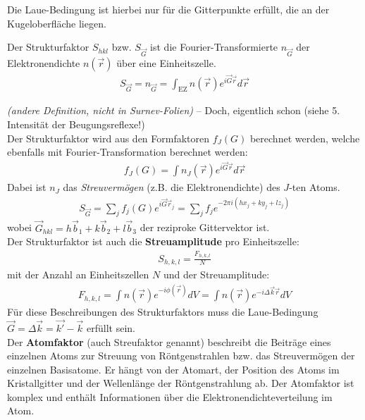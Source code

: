 Die Laue-Bedingung ist hierbei nur für die Gitterpunkte erfüllt, die an der Kugeloberfläche liegen. 


\label{q:27}

Der Strukturfaktor $S_{hkl}$ bzw. $S_{\vec{G}}$ ist die Fourier-Transformierte $n_{\Vec{G}}$ der Elektronendichte $n(\vec{r})$ über eine Einheitszelle. 
\begin{align}
    S_{\vec{G}} = n_{\vec{G}} = \int_{\text{EZ}} n(\vec{r}) e^{i \vec{G} \vec{r}} d\vec{r} 
\end{align}

\textit{(andere Definition, nicht in Surnev-Folien)} -- Doch, eigentlich schon (siehe 5. Intensität der Beugungsreflexe!) \\
Der Strukturfaktor wird aus den Formfaktoren $f_J(G)$ berechnet werden, welche ebenfalls mit Fourier-Transformation berechnet werden:
\begin{align}
f_J(G) = \int n_J(\vec{r}) e^{i \vec{G} \vec{r}} d\vec{r}
\end{align}
Dabei ist $n_J$ das \textit{Streuvermögen} (z.B. die Elektronendichte) des $J$-ten Atoms.
\begin{align}
S_{\vec{G}} = \sum_j f_j (G) e^{i \vec{G} \vec{r}_j} = \sum_j f_j e^{-2 \pi i (hx_j + ky_j + l z_j)}
\end{align}
wobei $\vec{G}_{hkl} = h\vec{b}_1+k\vec{b}_2+l\vec{b}_3$ der reziproke Gittervektor ist. \\




Der Strukturfaktor ist auch die \textbf{Streuamplitude} pro Einheitszelle:
\begin{align}
S_{h,k,l} = \frac{F_{h,k,l}}{N}
\end{align}
mit der Anzahl an Einheitszellen $N$ und der Streuamplitude:
\begin{align}
    F_{h,k,l} = \int n(\vec{r}) e^{-i \phi(\vec{r})} dV = \int n(\vec{r}) e^{-i \Delta \vec{k} \vec{r}} dV
\end{align}
Für diese Beschreibungen des Strukturfaktors muss die Laue-Bedingung $\vec{G} = \Delta \vec{k} = \vec{k'}-\vec{k}$ erfüllt sein. \bigskip \\

Der \textbf{Atomfaktor} (auch Streufaktor genannt) beschreibt die Beiträge eines einzelnen Atoms zur Streuung von Röntgenstrahlen bzw. das Streuvermögen der einzelnen Basisatome. Er hängt von der Atomart, der Position des Atoms im Kristallgitter und der Wellenlänge der Röntgenstrahlung ab. Der Atomfaktor ist komplex und enthält Informationen über die Elektronendichteverteilung im Atom.

